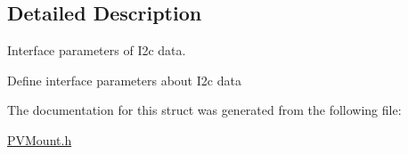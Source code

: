 \subsection{Detailed Description}
Interface parameters of I2c data. 

Define interface parameters about I2c data 

The documentation for this struct was generated from the following file\+:\begin{DoxyCompactItemize}
\item 
\hyperlink{_p_v_mount_8h}{P\+V\+Mount.\+h}\end{DoxyCompactItemize}

